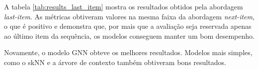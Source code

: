   A tabela \ref{tab:results_last_item} mostra os resultados obtidos pela abordagem
  \textit{last-item}. As métricas obtiveram valores na mesma faixa
  da abordagem \textit{next-item}, o que é positivo e demonstra que, por mais
  que a avaliação seja reservada apenas ao último item da sequência, os modelos
  conseguem manter um bom desempenho.
  
  Novamente, o modelo GNN obteve os melhores resultados. Modelos
  mais simples, como o skNN e a árvore de contexto também obtiveram bons
  resultados.




